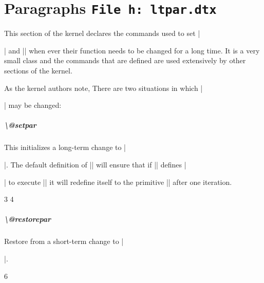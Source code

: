 \chapter{Paragraphs \texttt{File h: ltpar.dtx}}
\label{kernel:ltpar}

This section of the kernel declares the commands used to set |\par| and |\everypar|
when ever their function needs to be changed for a long time. It is a very small class
and the commands that are defined are used extensively by other sections of the kernel.

As the kernel authors note, There are two situations in which |\par| may be changed:


\paragraph{\textbackslash @setpar} This initializes a long-term change to |\par|. The default definition of |\@par| will ensure that if |\@restorepar| defines |\par|
to execute |\@par| it will redefine itself to the primitive |\@@par| after one iteration.

\begin{teX}
3 \def\@setpar#1{\def\par{#1}\def\@par{#1}}
4 \def\@par{\let\par\@@par\par}
\end{teX}

\paragraph{\textbackslash @restorepar} Restore from a short-term change to |\par|.

\begin{teX}
6 \def\@restorepar{\def\par{\@par}}
\end{teX}

\vfill